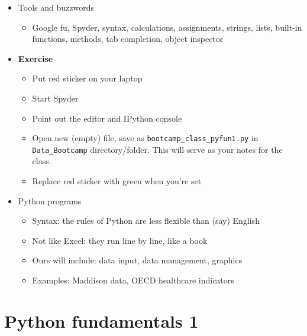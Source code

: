 \documentclass[11pt]{article}
\begin{document}
\begin{itemize}

\item Tools and buzzwords
\begin{itemize}
\item Google fu, Spyder, syntax, calculations, assignments, strings, lists, built-in functions, methods, tab completion, object inspector
\end{itemize}

\item {\bf Exercise}
\begin{itemize}
\item Put red sticker on your laptop
\item Start Spyder
\item Point out the editor and IPython console
\item Open new (empty) file, save as \verb|bootcamp_class_pyfun1.py| in \verb|Data_Bootcamp| directory/folder.  This will serve as your notes for the class.  
\item Replace red sticker with green when you're set
\end{itemize}


\item Python programs
\begin{itemize}
\item Syntax:  the rules of Python are less flexible than (say) English
\item Not like Excel: they run line by line, like a book
\item Ours will include:  data input, data management, graphics
\item Examples:  Maddison data, OECD healthcare indicators
\end{itemize}
\end{itemize}


\section*{Python fundamentals 1}
\end{document}
